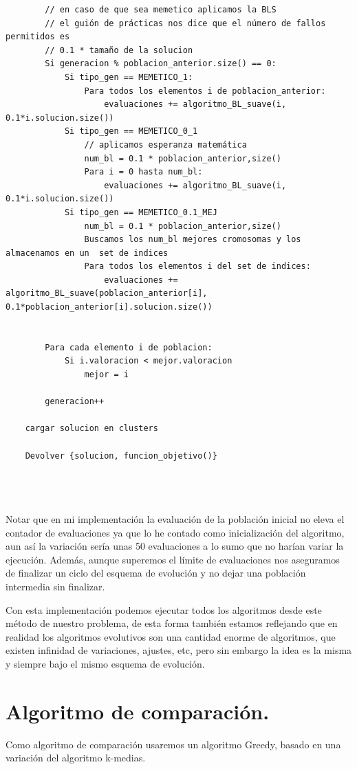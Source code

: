 \documentclass[12pt, spanish]{article}
\begin{document}
\begin{lstlisting}
		// en caso de que sea memetico aplicamos la BLS
		// el guión de prácticas nos dice que el número de fallos permitidos es
		// 0.1 * tamaño de la solucion
		Si generacion % poblacion_anterior.size() == 0:
			Si tipo_gen == MEMETICO_1:
				Para todos los elementos i de poblacion_anterior:
					evaluaciones += algoritmo_BL_suave(i, 0.1*i.solucion.size())
			Si tipo_gen == MEMETICO_0_1
				// aplicamos esperanza matemática
				num_bl = 0.1 * poblacion_anterior,size()
				Para i = 0 hasta num_bl:
					evaluaciones += algoritmo_BL_suave(i, 0.1*i.solucion.size())
			Si tipo_gen == MEMETICO_0.1_MEJ
				num_bl = 0.1 * poblacion_anterior,size()
				Buscamos los num_bl mejores cromosomas y los almacenamos en un  set de indices
				Para todos los elementos i del set de indices:
					evaluaciones += algoritmo_BL_suave(poblacion_anterior[i], 0.1*poblacion_anterior[i].solucion.size())
		
			
		Para cada elemento i de poblacion:
			Si i.valoracion < mejor.valoracion
				mejor = i

		generacion++
		
	cargar solucion en clusters
	
	Devolver {solucion, funcion_objetivo()}

	
		
\end{lstlisting}

Notar que en mi implementación la evaluación de la población inicial no eleva el contador de evaluaciones ya que lo he contado como inicialización del algoritmo, aun así la variación sería unas 50 evaluaciones a lo sumo que no harían variar la ejecución. Además, aunque superemos el límite de evaluaciones nos aseguramos de finalizar un ciclo del esquema de evolución y no dejar una población intermedia sin finalizar.

Con esta implementación podemos ejecutar todos los algoritmos desde este método de nuestro problema, de esta forma también estamos reflejando que en realidad los algoritmos evolutivos son una cantidad enorme de algoritmos, que existen infinidad de variaciones, ajustes, etc, pero sin embargo la idea es la misma y siempre bajo el mismo esquema de evolución.

\newpage

\section{Algoritmo de comparación.}

Como algoritmo de comparación usaremos un algoritmo Greedy, basado en una variación del algoritmo k-medias.
\end{document}
